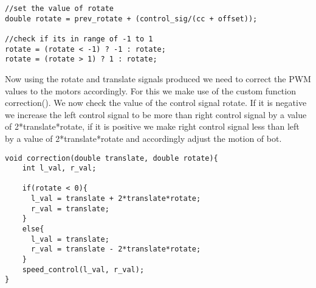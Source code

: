 \documentclass{article}
\begin{document}
\begin{tcolorbox}%
\begin{lstlisting}
//set the value of rotate
double rotate = prev_rotate + (control_sig/(cc + offset));

//check if its in range of -1 to 1
rotate = (rotate < -1) ? -1 : rotate;
rotate = (rotate > 1) ? 1 : rotate;
\end{lstlisting}
\end{tcolorbox}

Now using the rotate and translate signals produced we need to correct the PWM values to the motors accordingly. For this we make use of the custom function correction(). We now check the value of the control signal rotate. If it is negative we increase the left control signal to be more than right control signal by a value of 2*translate*rotate, if it is positive we make right control signal less than left by a value of 2*translate*rotate and accordingly adjust the motion of bot.

\begin{tcolorbox}[title={Code for PWM \texttt{correction()} function}]
\begin{lstlisting}
void correction(double translate, double rotate){
    int l_val, r_val;
    
    if(rotate < 0){
      l_val = translate + 2*translate*rotate;
      r_val = translate;
    }
    else{
      l_val = translate;
      r_val = translate - 2*translate*rotate;
    }
    speed_control(l_val, r_val);
}
\end{lstlisting}
\end{tcolorbox}
\end{document}
